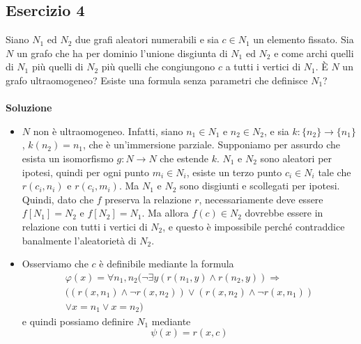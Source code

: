 \documentclass[10pt,a4paper]{article}
\def\phi{\varphi}
\begin{document}
\subsection*{Esercizio 4}
Siano $N_1$ ed $N_2$ due grafi aleatori numerabili e sia $c\in N_1$ un elemento fissato. Sia $N$ un grafo che ha per dominio l'unione disgiunta di $N_1$ ed $N_2$ e come archi quelli di $N_1$ pi\`u quelli di $N_2$ più quelli che congiungono $c$ a tutti i vertici di $N_1$. È $N$ un grafo ultraomogeneo? Esiste una formula senza parametri che definisce $N_1$?\\
\\
\noindent\textbf{Soluzione} \ 
\begin{itemize}

\item $N$ non è ultraomogeneo. Infatti, siano $n_1 \in N_1$ e $n_2 \in N_2$, e sia $k: \{n_2\} \rightarrow \{n_1\}$, $k(n_2)=n_1$, che è un'immersione parziale. Supponiamo per assurdo che esista un isomorfismo $g: N \rightarrow N$ che estende $k$. $N_1$ e $N_2$ sono aleatori per ipotesi, quindi per ogni punto $m_i \in N_i$, esiste un terzo punto $c_i \in N_i$ tale che $r(c_i,n_i)$ e $r(c_i,m_i)$. Ma $N_1$ e $N_2$ sono disgiunti e scollegati per ipotesi. Quindi, dato che $f$ preserva la relazione $r$, necessariamente deve essere $f[N_1]=N_2$ e $f[N_2]=N_1$. Ma allora $f(c) \in N_2$ dovrebbe essere in relazione con tutti i vertici di $N_2$, e questo è impossibile perché contraddice banalmente l'aleatorietà di $N_2$.

\item Osserviamo che $c$ è definibile mediante la formula
\begin{multline*}
\phi(x)=\forall n_1,n_2 \big(
\neg \exists y (r(n_1,y) \wedge r(n_2,y)) 
\Rightarrow \\
((r(x,n_1) \wedge \neg r(x,n_2)) \vee (r(x,n_2) \wedge \neg r(x,n_1)) \\
\vee x=n_1 \vee x=n_2
\big)
\end{multline*}
e quindi possiamo definire $N_1$ mediante
$$\psi(x)=r(x,c)$$

\end{itemize}
\end{document}
